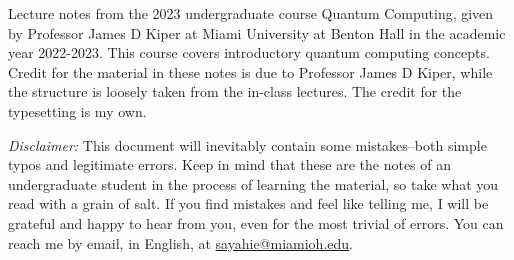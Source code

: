 Lecture notes from the 2023 undergraduate course Quantum Computing, given by Professor James D Kiper at Miami University at Benton Hall in the academic year 2022-2023. This course covers introductory quantum computing concepts. Credit for the material in these notes is due to Professor James D Kiper, while the structure is loosely taken from the in-class lectures. The credit for the typesetting is my own.

\textit{Disclaimer:} This document will inevitably contain some mistakes–both simple typos and legitimate errors. Keep in mind that these are the notes of an undergraduate student in the process of learning the material, so take what you read with a grain of salt. If you find mistakes and feel like telling me, I will be grateful and happy to hear from you, even for the most trivial of errors. You can reach me by email, in English, at \href{mailto:sayahie@miamioh.edu}{sayahie@miamioh.edu}.